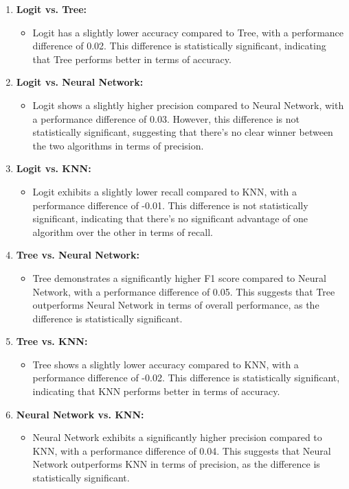 \documentclass{article}
\begin{document}
\begin{enumerate}
    \item \textbf{Logit vs. Tree:}
    \begin{itemize}
        \item Logit has a slightly lower accuracy compared to Tree, with a performance difference of 0.02. This difference is statistically significant, indicating that Tree performs better in terms of accuracy.
    \end{itemize}

    \item \textbf{Logit vs. Neural Network:}
    \begin{itemize}
        \item Logit shows a slightly higher precision compared to Neural Network, with a performance difference of 0.03. However, this difference is not statistically significant, suggesting that there's no clear winner between the two algorithms in terms of precision.
    \end{itemize}

    \item \textbf{Logit vs. KNN:}
    \begin{itemize}
        \item Logit exhibits a slightly lower recall compared to KNN, with a performance difference of -0.01. This difference is not statistically significant, indicating that there's no significant advantage of one algorithm over the other in terms of recall.
    \end{itemize}

    \item \textbf{Tree vs. Neural Network:}
    \begin{itemize}
        \item Tree demonstrates a significantly higher F1 score compared to Neural Network, with a performance difference of 0.05. This suggests that Tree outperforms Neural Network in terms of overall performance, as the difference is statistically significant.
    \end{itemize}

    \item \textbf{Tree vs. KNN:}
    \begin{itemize}
        \item Tree shows a slightly lower accuracy compared to KNN, with a performance difference of -0.02. This difference is statistically significant, indicating that KNN performs better in terms of accuracy.
    \end{itemize}

    \item \textbf{Neural Network vs. KNN:}
    \begin{itemize}
        \item Neural Network exhibits a significantly higher precision compared to KNN, with a performance difference of 0.04. This suggests that Neural Network outperforms KNN in terms of precision, as the difference is statistically significant.
    \end{itemize}
\end{enumerate}
\end{document}
